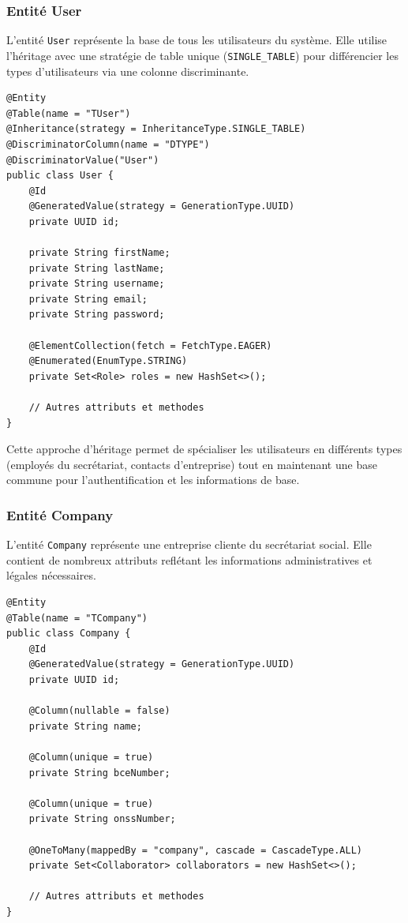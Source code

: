 \documentclass[12pt,a4paper]{report}
\begin{document}
\subsubsection{Entité User}

L'entité \texttt{User} représente la base de tous les utilisateurs du système. Elle utilise l'héritage avec une stratégie de table unique (\texttt{SINGLE\_TABLE}) pour différencier les types d'utilisateurs via une colonne discriminante.

\begin{lstlisting}
@Entity
@Table(name = "TUser")
@Inheritance(strategy = InheritanceType.SINGLE_TABLE)
@DiscriminatorColumn(name = "DTYPE")
@DiscriminatorValue("User")
public class User {
    @Id
    @GeneratedValue(strategy = GenerationType.UUID)
    private UUID id;
    
    private String firstName;
    private String lastName;
    private String username;
    private String email;
    private String password;
    
    @ElementCollection(fetch = FetchType.EAGER)
    @Enumerated(EnumType.STRING)
    private Set<Role> roles = new HashSet<>();
    
    // Autres attributs et methodes
}
\end{lstlisting}

Cette approche d'héritage permet de spécialiser les utilisateurs en différents types (employés du secrétariat, contacts d'entreprise) tout en maintenant une base commune pour l'authentification et les informations de base.

\subsubsection{Entité Company}

L'entité \texttt{Company} représente une entreprise cliente du secrétariat social. Elle contient de nombreux attributs reflétant les informations administratives et légales nécessaires.

\begin{lstlisting}
@Entity
@Table(name = "TCompany")
public class Company {
    @Id
    @GeneratedValue(strategy = GenerationType.UUID)
    private UUID id;
    
    @Column(nullable = false)
    private String name;
    
    @Column(unique = true)
    private String bceNumber;
    
    @Column(unique = true)
    private String onssNumber;
    
    @OneToMany(mappedBy = "company", cascade = CascadeType.ALL)
    private Set<Collaborator> collaborators = new HashSet<>();
    
    // Autres attributs et methodes
}
\end{lstlisting}
\end{document}
